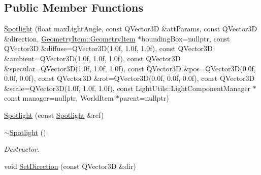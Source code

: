 \subsection*{Public Member Functions}
\begin{DoxyCompactItemize}
\item 
\mbox{\hyperlink{class_geometry_engine_1_1_geometry_world_item_1_1_geometry_light_1_1_spotlight_a421172550334c85b4a8c5b129578ea22}{Spotlight}} (float max\+Light\+Angle, const Q\+Vector3D \&att\+Params, const Q\+Vector3D \&direction, \mbox{\hyperlink{class_geometry_engine_1_1_geometry_world_item_1_1_geometry_item_1_1_geometry_item}{Geometry\+Item\+::\+Geometry\+Item}} $\ast$bounding\+Box=nullptr, const Q\+Vector3D \&diffuse=Q\+Vector3D(1.\+0f, 1.\+0f, 1.\+0f), const Q\+Vector3\+D \&ambient=\+Q\+Vector3\+D(1.\+0f, 1.\+0f, 1.\+0f), const Q\+Vector3\+D \&specular=\+Q\+Vector3\+D(1.\+0f, 1.\+0f, 1.\+0f), const Q\+Vector3\+D \&pos=\+Q\+Vector3\+D(0.\+0f, 0.\+0f, 0.\+0f), const Q\+Vector3\+D \&rot=\+Q\+Vector3\+D(0.\+0f, 0.\+0f, 0.\+0f), const Q\+Vector3\+D \&scale=\+Q\+Vector3\+D(1.\+0f, 1.\+0f, 1.\+0f), const Light\+Utils\+::\+Light\+Component\+Manager $\ast$const manager=nullptr, World\+Item $\ast$parent=nullptr)
\item 
\mbox{\hyperlink{class_geometry_engine_1_1_geometry_world_item_1_1_geometry_light_1_1_spotlight_a9d503c8da14980a0e7df3c9c0edde42c}{Spotlight}} (const \mbox{\hyperlink{class_geometry_engine_1_1_geometry_world_item_1_1_geometry_light_1_1_spotlight}{Spotlight}} \&ref)
\item 
\mbox{\label{class_geometry_engine_1_1_geometry_world_item_1_1_geometry_light_1_1_spotlight_a316a8bfae90cfab961bb11f5242c82af}} 
\mbox{\hyperlink{class_geometry_engine_1_1_geometry_world_item_1_1_geometry_light_1_1_spotlight_a316a8bfae90cfab961bb11f5242c82af}{$\sim$\+Spotlight}} ()
\begin{DoxyCompactList}\small\item\em Destructor. \end{DoxyCompactList}\item 
\mbox{\label{class_geometry_engine_1_1_geometry_world_item_1_1_geometry_light_1_1_spotlight_abb3bc09d1b7448311e9e13bd177dc80a}} 
void \mbox{\hyperlink{class_geometry_engine_1_1_geometry_world_item_1_1_geometry_light_1_1_spotlight_abb3bc09d1b7448311e9e13bd177dc80a}{Set\+Direction}} (const Q\+Vector3D \&dir)

\end{DoxyCompactItemize}
